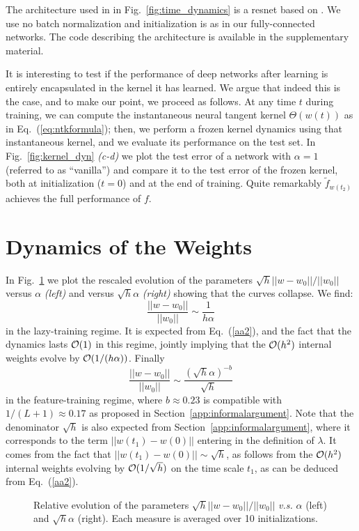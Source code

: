 \documentclass{article}
\newcommand{\be}{\begin{equation}}
\newcommand{\ee}{\end{equation}}
\renewcommand{\cite}[1]{\citep{#1}}
\newcommand{\abs}[1]{|\!|#1|\!|}
\newcommand{\eref}[1]{Eq.~(\ref{#1})}
\newcommand{\sref}[1]{Section~\ref{#1}}
\newcommand{\fref}[1]{Fig.~\ref{#1}}
\begin{document}
The architecture used in in \fref{fig:time_dynamics} is a resnet based on \cite{Zagoruyko2016WRN}. We use no batch normalization and initialization is as in our fully-connected networks.
The code describing the architecture is available in the supplementary material.

It is interesting to test if the performance of deep networks after learning is entirely encapsulated in the kernel it has learned. We argue that indeed this is the case, and to make our point, we proceed as follows. At any time $t$ during training, we can compute the instantaneous neural tangent kernel $\Theta(w(t))$ as in \eref{eq:ntkformula}; then, we perform a frozen kernel dynamics using that instantaneous kernel, and we evaluate its performance on the test set. In \fref{fig:kernel_dyn} \emph{(c-d)} we plot the test error of a network with $\alpha=1$ (referred to as ``vanilla'') and compare it to the test error of the frozen kernel, both at initialization ($t=0$) and at the end of training. Quite remarkably $\tilde f_{w(t_2)}$ achieves the full performance of $f$.



\section{Dynamics of the Weights} \label{app:weights_evolution}
In \fref{fig:weights_scalings} we plot the rescaled evolution of the parameters $\sqrt{h} \abs{w-w_0} / \abs{w_0}$ versus $\alpha$ \emph{(left)} and versus $\sqrt{h}\alpha$ \emph{(right)} showing that the curves collapse. We find:
\be
\frac{\abs{w-w_0}}{\abs{w_0}} \sim \frac1{h\alpha}
\ee
in the lazy-training regime. It is expected from \eref{aa2}, and the fact that the dynamics lasts ${\cal O}(1)$ in this regime, jointly  implying that the ${\cal O}(h^2)$ internal weights evolve by ${\cal O}(1/(h\alpha))$.
Finally
\be
\label{form}
\frac{\abs{w-w_0}}{\abs{w_0}} \sim \frac{(\sqrt{h}\alpha)^{-b}}{ \sqrt{h}}
\ee
in the feature-training regime, where $b\approx 0.23$ is compatible with $1/(L+1)\approx 0.17$ as proposed in \sref{app:informalargument}. Note that the denominator $\sqrt{h}$ is also expected from \sref{app:informalargument}, where it corresponds to the term $\abs{ w(t_1)-w(0)}$ entering in the definition of $\lambda$. It comes from the fact that $\abs{ w(t_1)-w(0)} \sim \sqrt{h}$, as follows from the ${\cal O}(h^2)$ internal weights evolving by ${\cal O}(1/\sqrt{h})$ on the time scale $t_1$, as can be deduced from \eref{aa2}.


\begin{figure}[ht]
    \centering
    \caption{Relative evolution of the parameters $\sqrt{h} \abs{w-w_0}/\abs{w_0}$ {\it v.s.} $\alpha$ (left) and $\sqrt{h} \alpha$ (right).
    Each measure is averaged over 10 initializations.
    \label{fig:weights_scalings}}
\end{figure}
\end{document}
